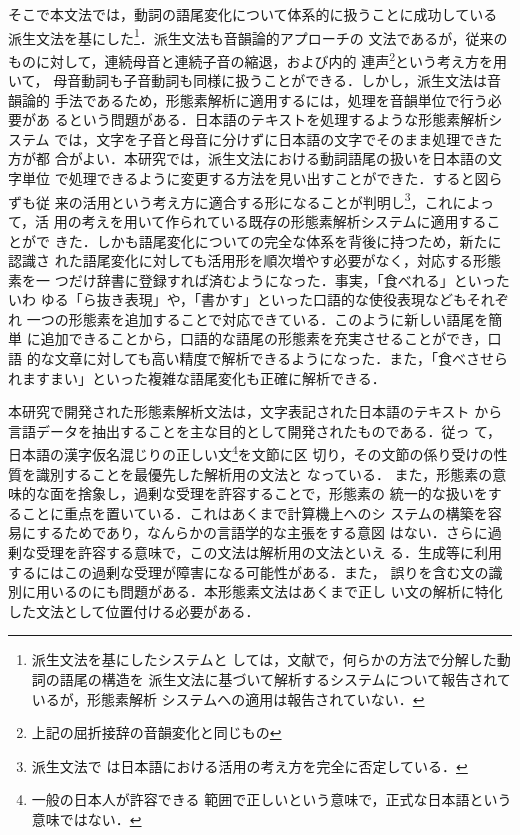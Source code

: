 そこで本文法では，動詞の語尾変化について体系的に扱うことに成功している
派生文法\cite{kiyose}を基にした\footnote{派生文法を基にしたシステムと
しては，文献\cite{nisino}で，何らかの方法で分解した動詞の語尾の構造を
派生文法に基づいて解析するシステムについて報告されているが，形態素解析
システムへの適用は報告されていない．}．派生文法も音韻論的アプローチの
文法であるが，従来のものに対して，連続母音と連続子音の縮退，および内的
連声\footnote{上記の屈折接辞の音韻変化と同じもの}という考え方を用いて，
母音動詞も子音動詞も同様に扱うことができる．しかし，派生文法は音韻論的
手法であるため，形態素解析に適用するには，処理を音韻単位で行う必要があ
るという問題がある．日本語のテキストを処理するような形態素解析システム
では，文字を子音と母音に分けずに日本語の文字でそのまま処理できた方が都
合がよい．本研究では，派生文法における動詞語尾の扱いを日本語の文字単位
で処理できるように変更する方法を見い出すことができた．すると図らずも従
来の活用という考え方に適合する形になることが判明し\footnote{派生文法で
は日本語における活用の考え方を完全に否定している．}，これによって，活
用の考えを用いて作られている既存の形態素解析システムに適用することがで
きた．しかも語尾変化についての完全な体系を背後に持つため，新たに認識さ
れた語尾変化に対しても活用形を順次増やす必要がなく，対応する形態素を一
つだけ辞書に登録すれば済むようになった．事実，「食べれる」といったいわ
ゆる「ら抜き表現」や，「書かす」といった口語的な使役表現などもそれぞれ
一つの形態素を追加することで対応できている．このように新しい語尾を簡単
に追加できることから，口語的な語尾の形態素を充実させることができ，口語
的な文章に対しても高い精度で解析できるようになった．また，「食べさせら
れますまい」といった複雑な語尾変化も正確に解析できる．

本研究で開発された形態素解析文法は，文字表記された日本語のテキスト
から言語データを抽出することを主な目的として開発されたものである．従っ
て，日本語の漢字仮名混じりの正しい文\footnote{一般の日本人が許容できる
範囲で正しいという意味で，正式な日本語という意味ではない．}を文節に区
切り，その文節の係り受けの性質を識別することを最優先した解析用の文法と
なっている．
また，形態素の意味的な面を捨象し，過剰な受理を許容することで，形態素の
統一的な扱いをすることに重点を置いている．これはあくまで計算機上へのシ
ステムの構築を容易にするためであり，なんらかの言語学的な主張をする意図
はない．さらに過剰な受理を許容する意味で，この文法は解析用の文法といえ
る．生成等に利用するにはこの過剰な受理が障害になる可能性がある．また，
誤りを含む文の識別に用いるのにも問題がある．本形態素文法はあくまで正し
い文の解析に特化した文法として位置付ける必要がある．

